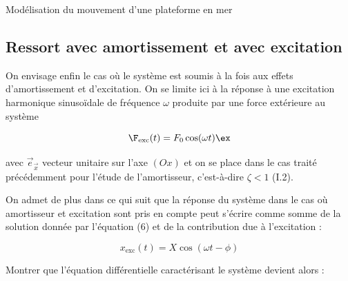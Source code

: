 \begin{exo}[PC][1][devoir]{Modélisation du mouvement d'une plateforme en mer}

  \subsection{Ressort avec amortissement et avec excitation}
  On envisage enfin le cas où le système est soumis à la fois aux effets d'amortissement et d'excitation. On se limite ici à la réponse à une excitation harmonique sinusoïdale de fréquence $\omega$ produite par une force extérieure au système

  \begin{equation}
    \F_{\text{exc}}(t)=F_{0} \cos (\omega t) \ex
  \end{equation}

  avec $\Vec{e}_{\Vec{x}}$ vecteur unitaire sur l'axe $(Ox)$ et on se place dans le cas traité précédemment pour l'étude de l'amortisseur, c'est-à-dire $\zeta<1$ (I.2).

  On admet de plus dans ce qui suit que la réponse du système dans le cas où amortisseur et excitation sont pris en compte peut s'écrire comme somme de la solution donnée par l'équation (6) et de la contribution due à l'excitation :

  \begin{equation}
    x_{\mathrm{exc}}(t)=X \cos (\omega t-\phi)
  \end{equation}

  \begin{quest}

  \item Montrer que l'équation différentielle caractérisant le système devient alors :


\end{quest}
\end{exo}
